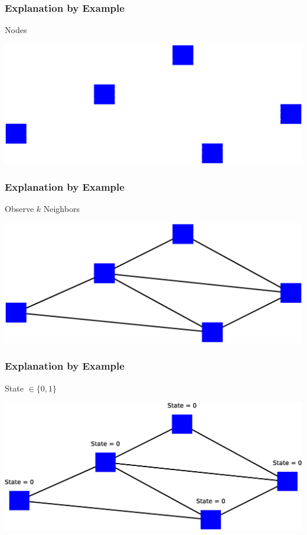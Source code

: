 \begin{frame}
    \frametitle{Explanation by Example}
    \begin{itemize}
        \gitem Nodes
    \end{itemize}
    \vspace{10.8pt}
    \includegraphics[width=\textwidth]{img/model1}
    \vfill
\end{frame}

\begin{frame}
    \frametitle{Explanation by Example}
    \begin{itemize}
        \gitem Observe $k$ Neighbors
    \end{itemize}
    \vspace{8.6pt}
    \includegraphics[width=\textwidth]{img/model2}
    \vfill
\end{frame}

\begin{frame}
    \frametitle{Explanation by Example}
    \begin{itemize}
        \gitem State $\in \lbrace 0, 1 \rbrace$
    \end{itemize}
    \vspace{8pt}
    \includegraphics[width=\textwidth]{img/model3}
    \vfill
\end{frame}

